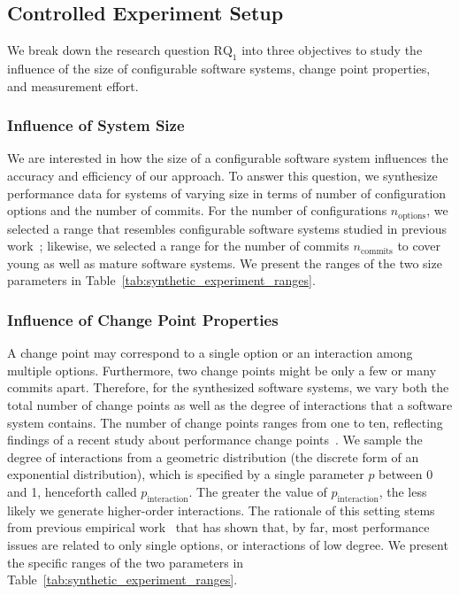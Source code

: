 \documentclass[sigconf]{acmart}
\begin{document}
	\subsection{Controlled Experiment Setup}
	We break down the research question $\text{RQ}_1$ into three objectives  to study the influence of the size of configurable software systems, change point properties, and measurement effort.
	
	\subsubsection{Influence of System Size}
	We are interested in how the size of a configurable software system influences the accuracy and efficiency of our approach. 
	To answer this question, we synthesize performance data for systems of varying size in terms of number of configuration options and the number of commits. For the number of configurations $n_\text{options}$, we selected a range that resembles configurable software systems studied in previous work~\cite{muhlbauer_accurate_2019}; likewise, we selected a range for the number of commits $n_\text{commits}$ to cover young as well as mature software systems. We present the ranges of the two size parameters in Table~\ref{tab:synthetic_experiment_ranges}.
	
	\subsubsection{Influence of Change Point Properties}
	A change point may correspond to a single option or an interaction among multiple options. Furthermore, two change points might be only a few or many commits apart. Therefore, for the synthesized software systems, we vary both the total number of change points as well as the degree of interactions that a software system contains. The number of change points ranges from one to ten, reflecting findings of a recent study about performance change points~\cite{muhlbauer_accurate_2019}. We sample the degree of interactions from a geometric distribution (the discrete form of an exponential distribution), which is specified by a single parameter $p$ between 0 and 1, henceforth called $p_\text{interaction}$. The greater the value of $p_\text{interaction}$, the less likely we generate higher-order interactions. The rationale of this setting stems from previous empirical work~\cite{medeiros_comparison_2016,kolesnikov_tradeoffs_2019} that has shown that, by far, most performance issues are related to only single options, or interactions of low degree. We present the specific ranges of the two parameters in Table~\ref{tab:synthetic_experiment_ranges}.
	
\end{document}
